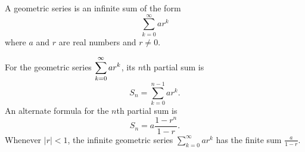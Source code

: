 

\begin{summary}
\item A geometric series is an infinite sum of the form
\[\sum_{k=0}^{\infty} ar^k\]
where $a$ and $r$ are real numbers and $r \neq 0$.
\item For the geometric series $\displaystyle \sum_{k=0}^{\infty} ar^k$, its $n$th partial sum is
\[S_n = \sum_{k=0}^{n-1} ar^k.\]
An alternate formula for the $n$th partial sum is
\[S_n = a \frac{1-r^n}{1-r}.\]
Whenever $|r| < 1$, the infinite geometric series $\sum_{k=0}^{\infty} ar^k$ has the finite sum $\frac{a}{1-r}$.
\end{summary}

\nin \hrulefill



\clearpage
